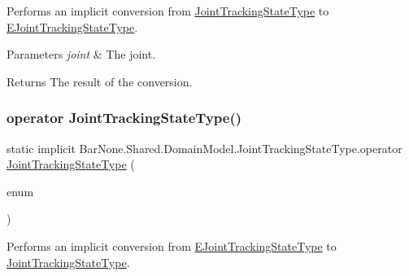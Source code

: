 Performs an implicit conversion from \mbox{\hyperlink{class_bar_none_1_1_shared_1_1_domain_model_1_1_joint_tracking_state_type}{Joint\+Tracking\+State\+Type}} to \mbox{\hyperlink{namespace_bar_none_1_1_shared_1_1_domain_model_abfb99d1de9684cc3f024f727b2a2b487}{E\+Joint\+Tracking\+State\+Type}}. 


\begin{DoxyParams}{Parameters}
{\em joint} & The joint.\\
\hline
\end{DoxyParams}
\begin{DoxyReturn}{Returns}
The result of the conversion. 
\end{DoxyReturn}
\mbox{\label{class_bar_none_1_1_shared_1_1_domain_model_1_1_joint_tracking_state_type_ac9ea994e7938b7f720410d878aadf668}} 
\subsubsection{\texorpdfstring{operator Joint\+Tracking\+State\+Type()}{operator JointTrackingStateType()}}
{\footnotesize\ttfamily static implicit Bar\+None.\+Shared.\+Domain\+Model.\+Joint\+Tracking\+State\+Type.\+operator \mbox{\hyperlink{class_bar_none_1_1_shared_1_1_domain_model_1_1_joint_tracking_state_type}{Joint\+Tracking\+State\+Type}} (\begin{DoxyParamCaption}\item[{\mbox{\hyperlink{namespace_bar_none_1_1_shared_1_1_domain_model_abfb99d1de9684cc3f024f727b2a2b487}{E\+Joint\+Tracking\+State\+Type}} @}]{enum }\end{DoxyParamCaption})\hspace{0.3cm}{\ttfamily [static]}}



Performs an implicit conversion from \mbox{\hyperlink{namespace_bar_none_1_1_shared_1_1_domain_model_abfb99d1de9684cc3f024f727b2a2b487}{E\+Joint\+Tracking\+State\+Type}} to \mbox{\hyperlink{class_bar_none_1_1_shared_1_1_domain_model_1_1_joint_tracking_state_type}{Joint\+Tracking\+State\+Type}}. 


